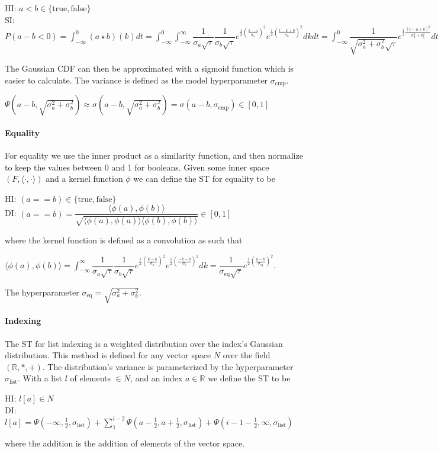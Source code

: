 \documentclass{article}
\begin{document}
\begin{center}
  HI: $a < b \in \{\text{true}, \text{false}\}$\\
  SI: $P(a - b < 0) = \int_{-\infty}^0 (a \star b) (k) dt = \int_{-\infty}^0 \int_{-\infty}^{\infty} \dfrac{1}{\sigma_a \sqrt{\tau}} \dfrac{1}{\sigma_b \sqrt{\tau}} e^{\frac{1}{2}(\frac{k - a}{\sigma_a})^2}e^{\frac{1}{2}(\frac{t-k + b}{\sigma_b})^2} dk dt = \int_{-\infty}^0 \dfrac{1}{\sqrt{\sigma_a^2 + \sigma_b^2} \sqrt{\tau}} e^{\frac{1}{2}\frac{(t - a + b)^2}{\sigma_a^2 + \sigma_b^2}}dt = \Psi(a - b, \sqrt{\sigma_a^2 + \sigma_b^2}) \in [0, 1]$
\end{center}
The Gaussian CDF can then be approximated with a sigmoid function which is easier to calculate. The variance is defined as the model hyperparameter $\sigma_{\text{cmp}}$.
\begin{center}
  $\Psi(a - b, \sqrt{\sigma_a^2 + \sigma_b^2}) \approx \sigma(a - b, \sqrt{\sigma_a^2 + \sigma_b^2}) = \sigma(a - b, \sigma_{\text{cmp}}) \in [0, 1]$
\end{center}
\paragraph{Equality} For equality we use the inner product as a similarity function, and then normalize to keep the values between 0 and 1 for booleans. Given some inner space $(F, \langle \cdot, \cdot \rangle)$ and a kernel function $\phi$ we can define the ST for equality to be
\begin{center}
  HI: $(a == b) \in \{\text{true}, \text{false}\}$\\
  DI: $(a == b) = \dfrac{\langle \phi(a), \phi(b) \rangle}{\sqrt{\langle \phi(a), \phi(a) \rangle \langle \phi(b), \phi(b) \rangle}} \in [0, 1]$
\end{center}
where the kernel function is defined as a convolution as such that
\begin{center}
  $\langle \phi(a), \phi(b) \rangle = \int_{-\infty}^{\infty} \dfrac{1}{\sigma_a \sqrt{\tau}} \dfrac{1}{\sigma_b \sqrt{\tau}} e^{\frac{1}{2}(\frac{k - a}{\sigma_a})^2}e^{\frac{1}{2}(\frac{-k - b}{\sigma_b})^2} dk = \dfrac{1}{\sigma_{\text{eq}} \sqrt{\tau}} e^{\frac{1}{2}(\frac{a - b}{\sigma_{\text{eq}}})^2}$.
\end{center}
The hyperparameter $\sigma_{\text{eq}} = \sqrt{\sigma_a^2 + \sigma_b^2}$.
\paragraph{Indexing} The ST for list indexing is a weighted distribution over the index's Gaussian distribution. This method is defined for any vector space $N$ over the field $(\mathbb{R}, *, +)$. The distribution's variance is parameterized by the hyperparameter $\sigma_{\text{list}}$. With a list $l$ of elements $\in N$, and an index $a \in \mathbb{R}$ we define the ST to be
\begin{center}
  HI: $l[a] \in N$\\
  DI: $l[a] = \Psi(-\infty, \frac{1}{2}, \sigma_{\text{list}}) + \sum_1^{i-2}\Psi(a-\frac{1}{2}, a+\frac{1}{2}, \sigma_{\text{list}}) + \Psi(i - 1 - \frac{1}{2}, \infty, \sigma_{\text{list}})$
\end{center}
where the addition is the addition of elements of the vector space.
\end{document}
